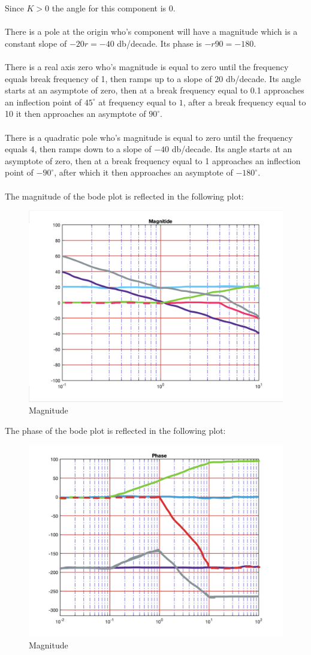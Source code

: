 \documentclass[12pt, letterpaper]{../assignment}
\begin{document}
Since $K > 0$ the angle for this component is $0$.
\\\\
There is a pole at the origin who's component will have a magnitude which is a constant slope of
$-20 r = -40 $ db/decade. Its phase is $-r90 = -180$.
\\\\
There is a real axis zero who's magnitude is equal to zero until the frequency equals break frequency of 1,
then ramps up to a slope of $20$ db/decade. Its angle starts at an asymptote of zero,
then at a break frequency equal to 0.1 approaches an inflection point of $45^\circ$ at frequency equal to $1$, after a break frequency equal to 10 it
then approaches an asymptote of $90^\circ$.
\\\\
There is a quadratic pole who's magnitude is equal to zero until the frequency equals 4,
then ramps down to a slope of $-40$ db/decade.
Its angle starts at an asymptote of zero,
then at a break frequency equal to 1 approaches an inflection point of $-90^\circ$, after which it
then approaches an asymptote of $-180^\circ$.
\\\\
The magnitude of the bode plot is reflected in the following plot:

\begin{figure}[H]
    \centering
    \includegraphics[width=0.7\linewidth]{./figures/Magnitude.png}
    \caption{Magnitude}
    \label{fig:step}
 \end{figure}

 The phase of the bode plot is reflected in the following plot:

\begin{figure}[H]
    \centering
    \includegraphics[width=0.6\linewidth]{./figures/Phase.png}
    \caption{Magnitude}
    \label{fig:step}
 \end{figure}
\end{document}

